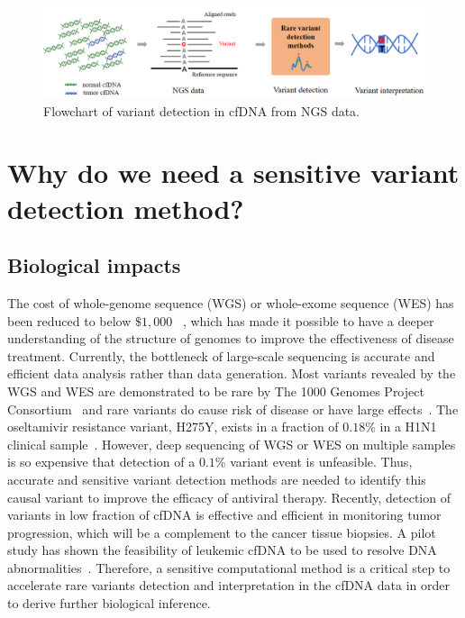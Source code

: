 \documentclass[a4,center,fleqn]{NAR}
\begin{document}
\begin{figure}[ht]
\centering
\includegraphics[width=1\textwidth]{flowchart.png}
\caption{Flowchart of variant detection in cfDNA from NGS data.}
\label{fig:flowchart}
\end{figure}


\section{Why do we need a sensitive variant detection method?}

\subsection{Biological impacts}

The cost of whole-genome sequence (WGS) or whole-exome sequence (WES) has been reduced to below $\$1,000$ ~\citep{caulfield2013reflections}, which has made it possible to have a deeper understanding of the structure of genomes to improve the effectiveness of disease treatment. 
Currently, the bottleneck of large-scale sequencing is accurate and efficient data analysis rather than data generation.
Most variants revealed by the WGS and WES are demonstrated to be rare by The 1000 Genomes Project Consortium~\citep{10002010map} and rare variants do cause risk of disease or have large effects~\citep{koboldt2013next, kosmicki2016discovery, ng2010exome, keller2013mutations}.
The oseltamivir resistance variant, H275Y, exists in a fraction of $0.18\%$ in a H1N1 clinical sample~\citep{Flaherty2012}.
However, deep sequencing of WGS or WES on multiple samples is so expensive that detection of a $0.1\%$ variant event is unfeasible.
Thus, accurate and sensitive variant detection methods are needed to identify this causal variant to improve the efficacy of antiviral therapy.
Recently, detection of variants in low fraction of cfDNA is effective and efficient in monitoring tumor progression, which will be a complement to the cancer tissue biopsies.
A pilot study has shown the feasibility of leukemic cfDNA to be used to resolve DNA abnormalities~\citep{zhou2014pilot}.
Therefore, a sensitive computational method is a critical step to accelerate rare variants detection and interpretation in the cfDNA data in order to derive further biological inference.
\end{document}
